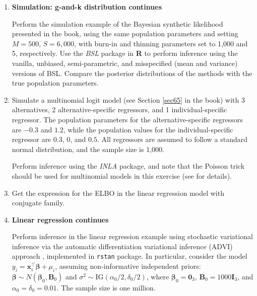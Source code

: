 \begin{enumerate}

	\item \textbf{Simulation: g-and-k distribution continues}
	
	Perform the simulation example of the Bayesian synthetic likelihood presented in the book, using the same population parameters and setting $M=500$, $S=6{,}000$, with burn-in and thinning parameters set to 1,000 and 5, respectively. Use the \textit{BSL} package in \textbf{R} to perform inference using the vanilla, unbiased, semi-parametric, and misspecified (mean and variance) versions of BSL. Compare the posterior distributions of the methods with the true population parameters. 

\item Simulate a multinomial logit model (see Section \ref{sec65} in the book) with 3 alternatives, 2 alternative-specific regressors, and 1 individual-specific regressor. The population parameters for the alternative-specific regressors are $-0.3$ and $1.2$, while the population values for the individual-specific regressor are $0.3$, $0$, and $0.5$. All regressors are assumed to follow a standard normal distribution, and the sample size is 1,000. 

Perform inference using the \textit{INLA} package, and note that the Poisson trick should be used for multinomial models in this exercise (see \cite{serafini2019multinomial} for details).	
	
\item Get the expression for the ELBO in the linear regression model with conjugate family.

\item \textbf{Linear regression continues}

Perform inference in the linear regression example using stochastic variational inference via the automatic differentiation variational inference (ADVI) approach \cite{kucukelbir2017automatic}, implemented in \texttt{rstan} package. In particular, consider the model $y_i = \boldsymbol{x}_i^{\top} \boldsymbol{\beta} + \mu_i$, assuming non-informative independent priors: $\boldsymbol{\beta} \sim N(\boldsymbol{\beta}_0, \boldsymbol{B}_0)$ and $\sigma^2 \sim \mathrm{IG}(\alpha_0/2, \delta_0/2)$, where $\boldsymbol{\beta}_0 = \boldsymbol{0}_3$, $\boldsymbol{B}_0 = 1000\boldsymbol{I}_3$, and $\alpha_0 = \delta_0 = 0.01$. The sample size is one million.


\end{enumerate}
